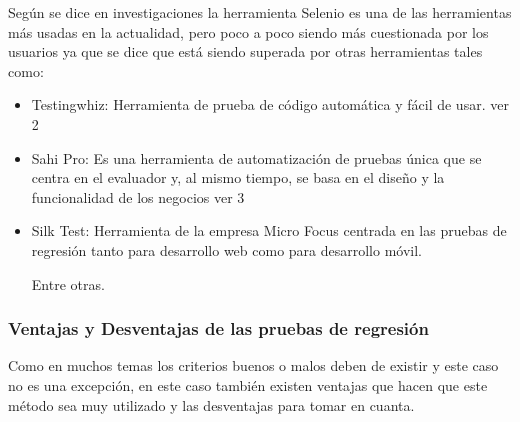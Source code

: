 \documentclass[conference]{IEEEtran}
\begin{document}
Según se dice en investigaciones la herramienta Selenio es una de las herramientas más usadas en la actualidad, pero poco a poco siendo más cuestionada por los usuarios ya que se dice que está siendo superada por otras herramientas tales como:
\begin{itemize}
\item Testingwhiz: Herramienta de prueba de código automática y fácil de usar. ver 2

\item Sahi Pro: Es una herramienta de automatización de pruebas única que se centra en el evaluador y, al mismo tiempo, se basa en el diseño y la funcionalidad de los negocios ver 3

\item Silk Test: Herramienta de la empresa Micro Focus centrada en las pruebas de regresión tanto para desarrollo web como para desarrollo móvil.

Entre otras.

\end{itemize}

\subsubsection{Ventajas y Desventajas de las pruebas de regresión} 

Como en muchos temas los criterios buenos o malos deben de existir y este caso no es una excepción, en este caso también existen ventajas que hacen que este método sea muy utilizado y las desventajas para tomar en cuanta.
\end{document}
